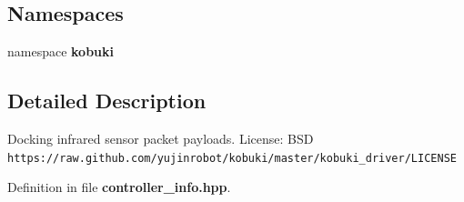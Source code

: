 \subsection*{\-Namespaces}
\begin{DoxyCompactItemize}
\item 
namespace {\bf kobuki}
\end{DoxyCompactItemize}


\subsection{\-Detailed \-Description}
\-Docking infrared sensor packet payloads. \-License\-: \-B\-S\-D {\tt https\-://raw.\-github.\-com/yujinrobot/kobuki/master/kobuki\-\_\-driver/\-L\-I\-C\-E\-N\-S\-E} 

\-Definition in file {\bf controller\-\_\-info.\-hpp}.

